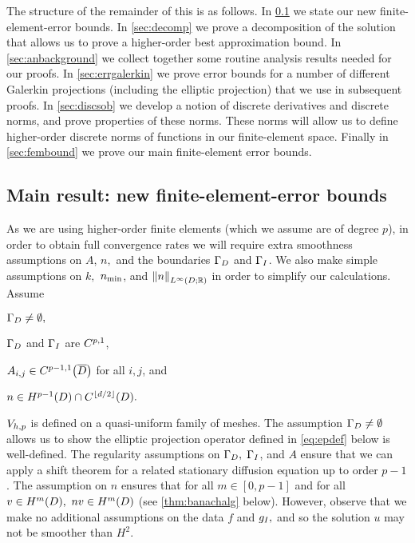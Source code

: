 The structure of the remainder of this  is as follows. In \cref{sec:errbounds} we state our new finite-element-error bounds. In \cref{sec:decomp} we prove a decomposition of the solution that allows us to prove a higher-order best approximation bound. In \cref{sec:anbackground} we collect together some routine analysis results needed for our proofs. In \cref{sec:errgalerkin} we prove error bounds for a number of different Galerkin projections (including the elliptic projection) that we use in subsequent proofs. In \cref{sec:discsob} we develop a notion of discrete derivatives and discrete norms, and prove properties of these norms. These norms will allow us to define higher-order discrete norms of functions in our finite-element space. Finally in \cref{sec:fembound} we prove our main finite-element error bounds.



\subsection{Main result: new finite-element-error bounds}\label{sec:errbounds}
As we are using higher-order finite elements (which we assume are of degree $p$), in order to obtain full convergence rates we will require extra smoothness assumptions on $A$, $n,$ and the boundaries $\Gamma_{D}$ and $\Gamma_{I}$. We also make simple assumptions on $k,$ $n_{\min}$, and $\NLiDRR{n}$ in order to simplify our calculations.
\label{ass:highp}
Assume
\bit
\item $\Gamma_{D} \neq \emptyset,$
\item $\Gamma_{D}$ and $\Gamma_{I}$ are $C^{p,1}$,
\item $\Aij \in \CpmooDclos$ for all $i,j$, and
\item $n \in \HpmoD \cap \CfloordtD.$
  \item $V_{h,p}$ is defined on a quasi-uniform family of meshes.
  \eit
  \eas
  The assumption $\Gamma_{D} \neq \emptyset$ allows us to show the elliptic projection operator defined in \cref{eq:epdef} below is well-defined. The regularity assumptions on $\Gamma_{D},$ $\Gamma_{I}$, and $A$ ensure that we can apply a shift theorem for a related stationary diffusion equation up to order $p-1$. The assumption on $n$ ensures that for all $m \in [0,p-1]$ and for all $v \in \HmD,$ $nv \in \HmD$ (see \cref{thm:banachalg} below). However, observe that we make no additional assumptions on the data $f$ and $g_{I},$ and so the solution $u$ may not be smoother than $H^2.$

